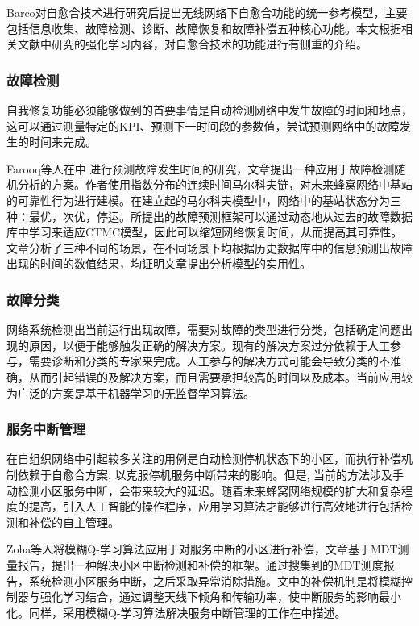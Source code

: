\documentclass{IEEEtran}
\begin{document}
Barco\cite{Barco2012}对自愈合技术进行研究后提出无线网络下自愈合功能的统一参考模型，主要包括信息收集、故障检测、诊断、故障恢复和故障补偿五种核心功能。本文根据相关文献中研究的强化学习内容，对自愈合技术的功能进行有侧重的介绍。

\subsubsection{故障检测}
自我修复功能必须能够做到的首要事情是自动检测网络中发生故障的时间和地点，这可以通过测量特定的KPI、预测下一时间段的参数值，尝试预测网络中的故障发生的时间来完成。

Farooq等人在\cite{Farooq2015}中 进行预测故障发生时间的研究，文章提出一种应用于故障检测随机分析的方案。作者使用指数分布的连续时间马尔科夫链，对未来蜂窝网络中基站的可靠性行为进行建模。在建立起的马尔科夫模型中，网络中的基站状态分为三种：最优，次优，停运。所提出的故障预测框架可以通过动态地从过去的故障数据库中学习来适应CTMC模型，因此可以缩短网络恢复时间，从而提高其可靠性。文章分析了三种不同的场景，在不同场景下均根据历史数据库中的信息预测出故障出现的时间的数值结果，均证明文章提出分析模型的实用性。

\subsubsection{故障分类}

网络系统检测出当前运行出现故障，需要对故障的类型进行分类，包括确定问题出现的原因，以便于能够触发正确的解决方案。现有的解决方案过分依赖于人工参与，需要诊断和分类的专家来完成。人工参与的解决方式可能会导致分类的不准确，从而引起错误的及解决方案，而且需要承担较高的时间以及成本。当前应用较为广泛的方案是基于机器学习的无监督学习算法。


\subsubsection{服务中断管理}

在自组织网络中引起较多关注的用例是自动检测停机状态下的小区，而执行补偿机制依赖于自愈合方案, 以克服停机服务中断带来的影响。但是, 当前的方法涉及手动检测小区服务中断，会带来较大的延迟。随着未来蜂窝网络规模的扩大和复杂程度的提高，引入人工智能的操作程序，应用学习算法才能够进行高效地进行包括检测和补偿的自主管理。

Zoha等人\cite{Zoha2016}将模糊Q-学习算法应用于对服务中断的小区进行补偿，文章基于MDT测量报告，提出一种解决小区中断检测和补偿的框架。通过搜集到的MDT测度报告，系统检测小区服务中断，之后采取异常消除措施。文中的补偿机制是将模糊控制器与强化学习结合，通过调整天线下倾角和传输功率，使中断服务的影响最小化。同样，采用模糊Q-学习算法解决服务中断管理的工作在\cite{Razavi2010}\cite{Razavi2010a}\cite{Islam2012}中描述。
\end{document}
